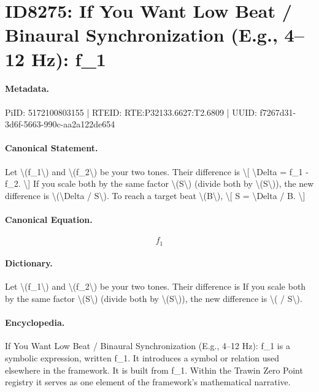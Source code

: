 \section*{ID8275: If You Want Low Beat / Binaural Synchronization (E.g., 4–12 Hz): f\_1}
\paragraph{Metadata.}
PiID: 5172100803155 | RTEID: RTE:P32133.6627:T2.6809 | UUID: f7267d31-3d6f-5663-990c-aa2a122de654

\paragraph{Canonical Statement.}
Let \textbackslash{}(f\_1\textbackslash{}) and \textbackslash{}(f\_2\textbackslash{}) be your two tones. Their difference is \textbackslash{}[ \textbackslash{}Delta = f\_1 - f\_2. \textbackslash{}] If you scale both by the same factor \textbackslash{}(S\textbackslash{}) (divide both by \textbackslash{}(S\textbackslash{})), the new difference is \textbackslash{}(\textbackslash{}Delta / S\textbackslash{}). To reach a target beat \textbackslash{}(B\textbackslash{}), \textbackslash{}[ S = \textbackslash{}Delta / B. \textbackslash{}]

\paragraph{Canonical Equation.}
\[
f_1
\]

\paragraph{Dictionary.}
Let \textbackslash{}(f\_1\textbackslash{}) and \textbackslash{}(f\_2\textbackslash{}) be your two tones. Their difference is If you scale both by the same factor \textbackslash{}(S\textbackslash{}) (divide both by \textbackslash{}(S\textbackslash{})), the new difference is \textbackslash{}( / S\textbackslash{}).

\paragraph{Encyclopedia.}
If You Want Low Beat / Binaural Synchronization (E.g., 4–12 Hz): f\_1 is a symbolic expression, written f\_1. It introduces a symbol or relation used elsewhere in the framework. It is built from f\_1. Within the Trawin Zero Point registry it serves as one element of the framework's mathematical narrative.
